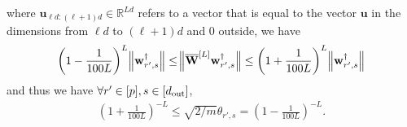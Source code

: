 where $\mathbf{u}_{\ell d : (\ell + 1)d} \in \mathbb{R}^{Ld}$ refers to a vector that is equal to the vector $\mathbf{u}$ in the dimensions from $\ell d$ to $(\ell + 1)d$ and $0$ outside, we have
\begin{align*}
	\left(1 - \frac{1}{100L}\right)^{L} \norm[2]{\mathbf{w}_{r', s}^{\dagger}} \le  \norm[2]{\overline{\mathbf{W}}^{[L]} \mathbf{w}_{r', s}^{\dagger}} \le \left(1 + \frac{1}{100L}\right)^{L} \norm[2]{\mathbf{w}_{r', s}^{\dagger}}
\end{align*}
and thus we have $\forall  r' \in [p], s \in [d_{\mathrm{out}} ]$,
\begin{align}
	\left(1 + \frac{1}{100L}\right)^{-L}  \le \sqrt{2/m} \theta_{r', s} = \left(1 - \frac{1}{100L}\right)^{-L}  \label{eq:abstheta_lowerbound}.
\end{align}



